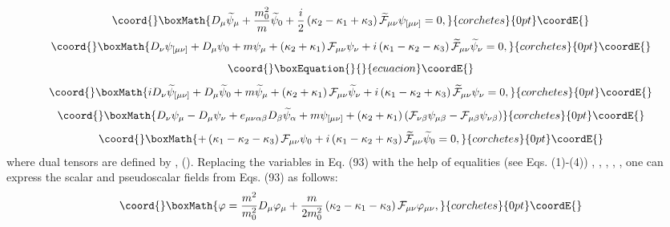 \documentclass[a4paper,12pt]{article}
\begin{document}
\[\coord{}\boxMath{
D_\mu \widetilde{\psi}_\mu+\frac{m_0^2}{m}\widetilde{\psi}_0
+\frac{i}{2}\left(\kappa_2 -\kappa_1 +\kappa_3\right)\widetilde{
{\cal F}}_{\mu\nu}\psi_{[\mu\nu]}=0 ,
}{corchetes}{0pt}\coordE{}\]
\[\coord{}\boxMath{
D_\nu \psi_{[\mu\nu]} +D_{\mu}\psi_0 + m\psi_\mu  +
 \left(\kappa_2 +\kappa_1 \right){\cal
F}_{\mu\nu}\psi_{\nu}+i\left(\kappa_1 -\kappa_2
-\kappa_3\right)\widetilde{ {\cal
F}}_{\mu\nu}\widetilde{\psi}_{\nu}=0 ,
}{corchetes}{0pt}\coordE{}\]
\vspace{-7mm}
\begin{equation}\coord{}\boxEquation{  \label{93}
}{  }{ecuacion}\coordE{}\end{equation}
\vspace{-7mm}
\[\coord{}\boxMath{
iD_\nu \widetilde{\psi}_{[\mu\nu]} +D_{\mu}\widetilde{\psi}_0 +
m\widetilde{\psi}_\mu  +
 \left(\kappa_2 +\kappa_1 \right){\cal
F}_{\mu\nu}\widetilde{\psi}_{\nu}+i\left(\kappa_1 -\kappa_2
+\kappa_3\right)\widetilde{ {\cal F}}_{\mu\nu}\psi_{\nu}=0 ,
}{corchetes}{0pt}\coordE{}\]
\[\coord{}\boxMath{
D_\nu \psi_{\mu} -D_{\mu}\psi_\nu + e_{\mu\nu\alpha\beta}D_\beta
\widetilde{\psi}_\alpha + m\psi_{[\mu \nu]} +
 \left(\kappa_2 +\kappa_1 \right)\left({\cal
F}_{\nu\beta}\psi_{\mu\beta}- {\cal
F}_{\mu\beta}\psi_{\nu\beta}\right)
}{corchetes}{0pt}\coordE{}\]
\[\coord{}\boxMath{
+\left(\kappa_1 -\kappa_2 -\kappa_3\right)  {\cal F}_{\mu\nu}
\psi_0 +i\left(\kappa_1 -\kappa_2 +\kappa_3\right)\widetilde{
{\cal F}}_{\mu\nu}\widetilde{\psi}_0=0 ,
}{corchetes}{0pt}\coordE{}\]
where dual tensors are defined by \coordHE{}, \coordHE{} (\coordHE{}). Replacing the variables in Eq. (93)
with the help of equalities (see Eqs. (1)-(4)) \coordHE{}, \coordHE{}, \myHighlight{$\psi _{[\mu \nu ]}=\varphi _{\mu
\nu }$}\coordHE{}, \coordHE{},
\coordHE{}, one can express the
scalar and pseudoscalar fields from Eqs. (93) as follows:
\[\coord{}\boxMath{
\varphi =\frac{m^2}{m_0^2}D_\mu \varphi_\mu
+\frac{m}{2m_0^2}\left(\kappa_2 -\kappa_1 -\kappa_3\right){\cal
F}_{\mu\nu}\varphi_{\mu\nu} ,
}{corchetes}{0pt}\coordE{}\]
\vspace{-7mm}
\end{document}
